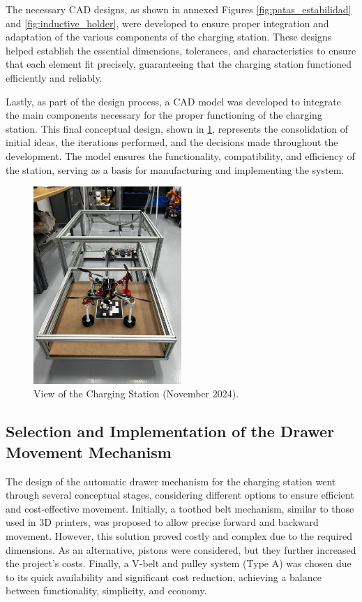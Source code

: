 The necessary CAD designs, as shown in annexed Figures \ref{fig:patas_estabilidad} and \ref{fig:inductive_holder}, were developed to ensure proper integration and adaptation of the various components of the charging station. These designs helped establish the essential dimensions, tolerances, and characteristics to ensure that each element fit precisely, guaranteeing that the charging station functioned efficiently and reliably.


Lastly, as part of the design process, a CAD model was developed to integrate the main components necessary for the proper functioning of the charging station. This final conceptual design, shown in \ref{fig:final_estacion}, represents the consolidation of initial ideas, the iterations performed, and the decisions made throughout the development. The model ensures the functionality, compatibility, and efficiency of the station, serving as a basis for manufacturing and implementing the system.

        \begin{figure}[H]
            \centering
            \includegraphics[width=0.5\textwidth]{pictures/ESTACION_FINAL.jpg}
            \caption{View of the Charging Station (November 2024).}
            \label{fig:final_estacion}
        \end{figure}

\subsection{Selection and Implementation of the Drawer Movement Mechanism}

The design of the automatic drawer mechanism for the charging station went through several conceptual stages, considering different options to ensure efficient and cost-effective movement. Initially, a toothed belt mechanism, similar to those used in 3D printers, was proposed to allow precise forward and backward movement. However, this solution proved costly and complex due to the required dimensions. As an alternative, pistons were considered, but they further increased the project's costs. Finally, a V-belt and pulley system (Type A) was chosen due to its quick availability and significant cost reduction, achieving a balance between functionality, simplicity, and economy.

